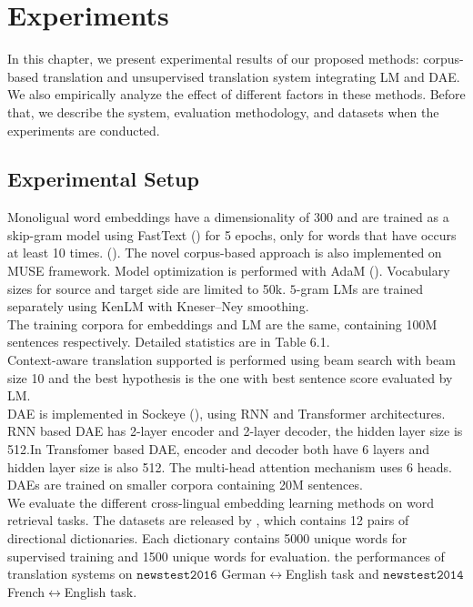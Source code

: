 \chapter{Experiments}
In this chapter, we present experimental results of our proposed methods: corpus-based translation and unsupervised translation system integrating LM and DAE. We also empirically analyze the effect of different factors in these methods. Before that, we describe the system, evaluation methodology, and datasets when the experiments are conducted.
\section{Experimental Setup}
Monoligual word embeddings have a dimensionality of 300 and  are trained as a skip-gram model using FastText (\cite{bojanowski2016enriching}) for 5 epochs, only for words that have occurs at least 10 times. (\cite{conneau2017word}). The novel corpus-based approach is also implemented on MUSE framework. Model optimization is performed with AdaM (\cite{bibid}).  Vocabulary sizes for source and target side are limited to 50k.
$5$-gram LMs are trained separately using KenLM with Kneser–Ney smoothing.\\
The training corpora for embeddings and LM are the same, containing 100M sentences respectively. Detailed statistics are in Table 6.1.\\
Context-aware translation supported is performed using beam search with beam size 10 and the best hypothesis is the one with best sentence score evaluated by LM.\\
DAE is implemented in Sockeye (\cite{hieber2017sockeye}), using RNN and Transformer architectures. RNN based DAE has 2-layer encoder and 2-layer decoder, the hidden layer size is 512.In Transfomer based DAE, encoder and decoder both have 6 layers and hidden layer size is also 512. The multi-head attention mechanism uses 6 heads. DAEs are trained on smaller corpora containing 20M sentences. \\
We evaluate the different cross-lingual embedding learning methods on word retrieval tasks. The datasets are released by \cite{conneau2017word}, which contains 12 pairs of directional dictionaries. Each dictionary contains 5000 unique words for supervised training and 1500 unique words for evaluation.  the performances of translation systems on $\texttt{newstest2016}$ German$\leftrightarrow$English task and  $\texttt{newstest2014}$ French$\leftrightarrow$English task.


